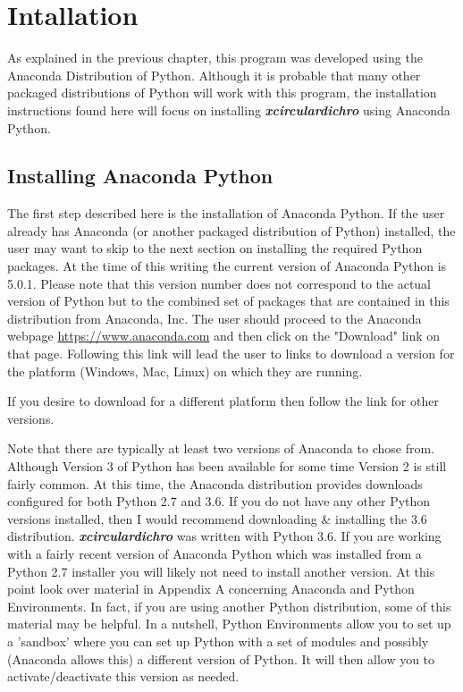 \documentclass[12pt,letterpaper, openany]{book}
\begin{document}
 
\chapter{Intallation}
As explained in the previous chapter, this program was developed using the Anaconda Distribution of Python.  Although it is probable that many other packaged distributions of Python will work with this program, the installation instructions found here will focus on installing \textbf{\textit{xcirculardichro}} using Anaconda Python.  

\section{Installing Anaconda Python}
The first step described here is the installation of Anaconda Python.  If the user already has Anaconda (or another packaged distribution of Python) installed, the user may want to skip to the next section on installing the required Python packages.  
At the time of this writing the current version of Anaconda Python is 5.0.1.  Please note that this version number does not correspond to the actual version of Python but to the combined set of packages that are contained in this distribution from Anaconda, Inc.  The user should proceed to the Anaconda webpage \url{https://www.anaconda.com} and then click on the "Download" link on that page.  Following this link will lead the user to links to download a version for the platform (Windows, Mac, Linux) on which they are running.  
\newline
\vspace{3mm}


  {
   \begin{minipage}{5.0in}
      If you desire to download for a different platform then follow the link for other versions.
   \end{minipage}}

\vspace{3mm}

\noindent
Note that there are typically at least two versions of Anaconda to chose from.  Although Version 3 of Python has been available for some time Version 2 is still fairly common.  At this time, the Anaconda distribution provides downloads configured for both Python 2.7 and 3.6.  If you do not have any other Python versions installed, then I would recommend downloading \& installing the 3.6 distribution.  \textbf{\textit{xcirculardichro}} was written with Python 3.6.
If you are working with a fairly recent version of Anaconda Python which was installed from a Python 2.7 installer you will likely not need to install another version.  At this point look over material in Appendix A concerning Anaconda and Python Environments.  In fact, if you are using another Python distribution, some of this material may be helpful.  In a nutshell, Python Environments allow you to set up a 'sandbox' where you can set up Python with a set of modules and possibly (Anaconda allows this) a different version of Python.  It will then allow you to activate/deactivate this version as needed.
\end{document}
